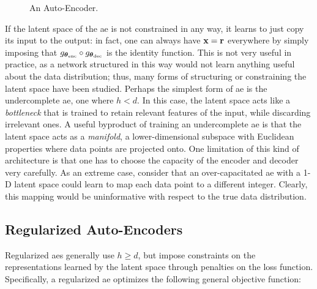\begin{figure*}[h!]
    \centering
    \resizebox{.45\textwidth}{!}{}
    \caption{An Auto-Encoder.}
    \label{fig:autoencoder}
\end{figure*}
If the latent space of the \gls{ae} is not constrained in any way, it learns to just copy its input to the output: in fact, one can always have $\Vector{x} = \Vector{r}$ everywhere by simply imposing that $g_{\boldsymbol{\theta}_{\mathrm{enc}}} \circ g_{\boldsymbol{\theta}_{\mathrm{dec}}}$ is the identity function. This is not very useful in practice, as a network structured in this way would not learn anything useful about the data distribution; thus, many forms of structuring or constraining the latent space have been studied. Perhaps the simplest form of \gls{ae} is the undercomplete \gls{ae}, \ie one where $h < d$. In this case, the latent space acts like a \emph{bottleneck} that is trained to retain relevant features of the input, while discarding irrelevant ones.
A useful byproduct of training an undercomplete \gls{ae} is that the latent space acts as a \emph{manifold}, \ie a lower-dimensional subspace with Euclidean properties where data points are projected onto. One limitation of this kind of architecture is that one has to choose the capacity of the encoder and decoder very carefully. As an extreme case, consider that an over-capacitated \gls{ae} with a 1-D latent space could learn to map each data point to a different integer. Clearly, this mapping would be uninformative with respect to the true data distribution. 

\subsection{Regularized Auto-Encoders}
Regularized \glspl{ae} generally use $h \geq d$, but impose constraints on the representations learned by the latent space through penalties on the loss function. Specifically, a regularized \gls{ae} optimizes the following general objective function:


